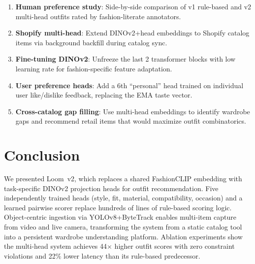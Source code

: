 \documentclass[10pt,twocolumn]{article}
\begin{document}
\begin{enumerate}[leftmargin=*,topsep=2pt,itemsep=1pt]
\item \textbf{Human preference study}: Side-by-side comparison of v1
  rule-based and v2 multi-head outfits rated by fashion-literate
  annotators.
\item \textbf{Shopify multi-head}: Extend DINOv2+head embeddings to
  Shopify catalog items via background backfill during catalog sync.
\item \textbf{Fine-tuning DINOv2}: Unfreeze the last 2 transformer blocks
  with low learning rate for fashion-specific feature adaptation.
\item \textbf{User preference heads}: Add a 6th ``personal'' head trained
  on individual user like/dislike feedback, replacing the EMA taste
  vector.
\item \textbf{Cross-catalog gap filling}: Use multi-head embeddings to
  identify wardrobe gaps and recommend retail items that would maximize
  outfit combinatorics.
\end{enumerate}

\section{Conclusion}

We presented Loom~v2, which replaces a shared FashionCLIP embedding with
task-specific DINOv2 projection heads for outfit recommendation.  Five
independently trained heads (style, fit, material, compatibility,
occasion) and a learned pairwise scorer replace hundreds of lines of
rule-based scoring logic.  Object-centric ingestion via YOLOv8+ByteTrack
enables multi-item capture from video and live camera, transforming the
system from a static catalog tool into a persistent wardrobe understanding
platform.  Ablation experiments show the multi-head system achieves
44$\times$ higher outfit scores with zero constraint violations and 22\%
lower latency than its rule-based predecessor.
\end{document}
